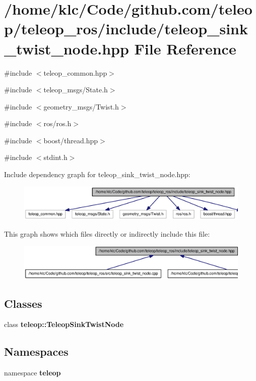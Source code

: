 \section{/home/klc/Code/github.com/teleop/teleop\_\-ros/include/teleop\_\-sink\_\-twist\_\-node.hpp File Reference}
\label{teleop__sink__twist__node_8hpp}
{\ttfamily \#include $<$teleop\_\-common.hpp$>$}\par
{\ttfamily \#include $<$teleop\_\-msgs/State.h$>$}\par
{\ttfamily \#include $<$geometry\_\-msgs/Twist.h$>$}\par
{\ttfamily \#include $<$ros/ros.h$>$}\par
{\ttfamily \#include $<$boost/thread.hpp$>$}\par
{\ttfamily \#include $<$stdint.h$>$}\par
Include dependency graph for teleop\_\-sink\_\-twist\_\-node.hpp:
\nopagebreak
\begin{figure}[H]
\begin{center}
\leavevmode
\includegraphics[width=400pt]{teleop__sink__twist__node_8hpp__incl}
\end{center}
\end{figure}
This graph shows which files directly or indirectly include this file:
\nopagebreak
\begin{figure}[H]
\begin{center}
\leavevmode
\includegraphics[width=400pt]{teleop__sink__twist__node_8hpp__dep__incl}
\end{center}
\end{figure}
\subsection*{Classes}
\begin{DoxyCompactItemize}
\item 
class {\bf teleop::TeleopSinkTwistNode}
\end{DoxyCompactItemize}
\subsection*{Namespaces}
\begin{DoxyCompactItemize}
\item 
namespace {\bf teleop}
\end{DoxyCompactItemize}
